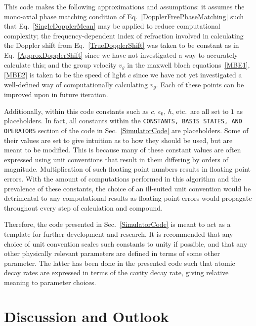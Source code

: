 \documentclass[aps,pra,showpacs,amsmath,amssymb,nofootinbib,longbibliography,superscriptaddress
]{revtex4-1}
\theoremstyle{definition}
\theoremstyle{remark}
\newcommand{\0}{\hat{0}}
\begin{document}
This code makes the following approximations and assumptions: it assumes the mono-axial phase matching condition of Eq.~\eqref{DopplerFreePhaseMatching} such that Eq.~\eqref{SingleDopplerMean} may be applied to reduce computational complexity; the frequency-dependent index of refraction involved in calculating the Doppler shift from Eq.~\eqref{TrueDopplerShift} was taken to be constant as in Eq.~\eqref{ApproxDopplerShift} since we have not investigated a way to accurately calculate this; and the group velocity $v_g$ in the maxwell bloch equations~\eqref{MBE1},\eqref{MBE2} is taken to be the speed of light $c$ since we have not yet investigated a well-defined way of computationally calculating $v_g$. Each of these points can be improved upon in future iteration.

Additionally, within this code constants such as $c$, $\epsilon_0$, $\hbar$, etc.~are all set to $1$ as placeholders. In fact, all constants within the \lstinline|CONSTANTS, BASIS STATES, AND OPERATORS| section of the code in Sec.~\ref{SimulatorCode} are placeholders. Some of their values are set to give intuition as to how they should be used, but are meant to be modified. This is because many of these constant values are often expressed using unit conventions that result in them differing by orders of magnitude. Multiplication of such floating point numbers results in floating point errors. With the amount of computations performed in this algorithm and the prevalence of these constants, the choice of an ill-suited unit convention would be detrimental to any computational results as floating point errors would propagate throughout every step of calculation and compound.

Therefore, the code presented in Sec.~\ref{SimulatorCode} is meant to act as a template for further development and research. It is recommended that any choice of unit convention scales such constants to unity if possible, and that any other physically relevant parameters are defined in terms of some other parameter. The latter has been done in the presented code such that atomic decay rates are expressed in terms of the cavity decay rate, giving relative meaning to parameter choices.

\section{Discussion and Outlook}\label{Discussion}
\end{document}

